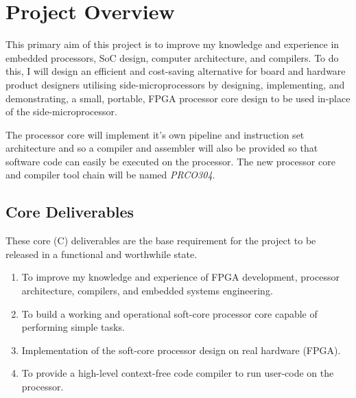 \documentclass[11pt,a4paper]{report}
\newcommand{\scname}{PRCO304}
\begin{document}
\newpage

\section{Project Overview}
This primary aim of this project is to improve my knowledge and experience in embedded processors, SoC design, computer architecture, and compilers. To do this, I will design an efficient and cost-saving alternative for board and hardware product designers utilising side-microprocessors by designing, implementing, and demonstrating, a small, portable, FPGA processor core design to be used in-place of the side-microprocessor. 

The processor core will implement it's own pipeline and instruction set architecture and so a compiler and assembler will also be provided so that software code can easily be executed on the processor. The new processor core and compiler tool chain will be named \textit{\scname{}}.

\subsection{Core Deliverables}
These core (C) deliverables are the base requirement for the project to be released in a functional and worthwhile state.
\begin{enumerate}[label=\bfseries C\arabic*.]
\item{To improve my knowledge and experience of FPGA development, processor architecture, compilers, and embedded systems engineering.}
\label{c1}
\item{To build a working and operational soft-core processor core capable of performing simple tasks.}
\item{Implementation of the soft-core processor design on real hardware (FPGA).}
\item{To provide a high-level context-free code compiler to run user-code on the processor.}
\end{enumerate}
\end{document}
